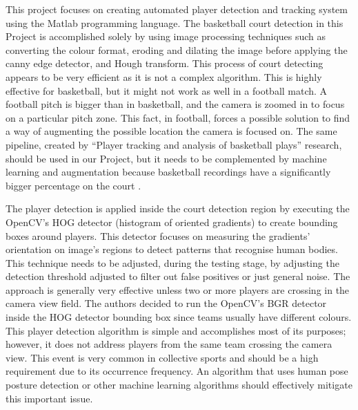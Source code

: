 \documentclass[
11pt,
twoside
]{report}
\begin{document}
This project \cite{baskettrack} focuses on creating automated player detection and tracking system using the Matlab programming language. The basketball court detection in this Project is accomplished solely by using image processing techniques such as converting the colour format, eroding and dilating the image before applying the canny edge detector, and Hough transform. This process of court detecting appears to be very efficient as it is not a complex algorithm. This is highly effective for basketball, but it might not work as well in a football match. A football pitch is bigger than in basketball, and the camera is zoomed in to focus on a particular pitch zone. This fact, in football, forces a possible solution to find a way of augmenting the possible location the camera is focused on. The same pipeline, created by ``Player tracking and analysis of basketball plays'' research, should be used in our Project, but it needs to be complemented by machine learning and augmentation because basketball recordings have a significantly bigger percentage on the court \cite{baskettrack}.


The player detection is applied inside the court detection region by executing the OpenCV's \cite{opencv} HOG detector (histogram of oriented gradients) to create bounding boxes around players. This detector focuses on measuring the gradients' orientation on image's regions to detect patterns that recognise human bodies. This technique needs to be adjusted, during the testing stage, by adjusting the detection threshold adjusted to filter out false positives or just general noise. The approach is generally very effective unless two or more players are crossing in the camera view field. The authors decided to run the OpenCV's BGR detector inside the HOG detector bounding box since teams usually have different colours. This player detection algorithm is simple and accomplishes most of its purposes; however, it does not address players from the same team crossing the camera view. This event is very common in collective sports and should be a high requirement due to its occurrence frequency. An algorithm that uses human pose posture detection or other machine learning algorithms should effectively mitigate this important issue.
\end{document}
